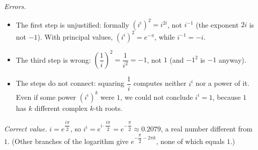 \emph{Errors.}
\begin{itemize}
\item The first step is unjustified: formally $\left(i^i\right)^2=i^{2i}$, not $i^{-1}$ (the exponent $2i$ is not $-1$). With principal values, $\left(i^i\right)^2=e^{-\pi}$, while $i^{-1}=-i$.
\item The third step is wrong: $\left(\dfrac1i\right)^2=\dfrac1{i^2}=-1$, not $1$ (and $-1^2$ is $-1$ anyway).
\item The steps do not connect: squaring $\dfrac1i$ computes neither $i^i$ nor a power of it. Even if some power $\left(i^i\right)^k$ were $1$, we could not conclude $i^i=1$, because $1$ has $k$ different complex $k$-th roots.
\end{itemize}
\emph{Correct value.} $i=e^{\dfrac{i\pi}{2}}$, so $i^i=e^{i\cdot\dfrac{i\pi}{2}}=\boxed{e^{-\dfrac{\pi}{2}}\approx0.2079}$, a real number different from $1$. (Other branches of the logarithm give $e^{-\dfrac\pi2-2\pi k}$, none of which equals $1$.)
